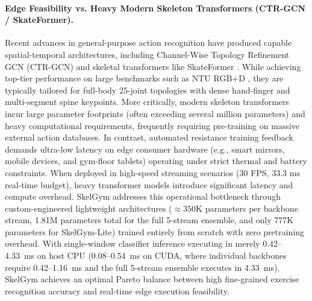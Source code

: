 \documentclass[runningheads]{llncs}
\begin{document}
\paragraph{Edge Feasibility vs. Heavy Modern Skeleton Transformers (CTR-GCN / SkateFormer).}
Recent advances in general-purpose action recognition have produced capable spatial-temporal architectures, including Channel-Wise Topology Refinement GCN (CTR-GCN) \cite{chen2021channel} and skeletal transformers like SkateFormer \cite{zheng2024skateformer}. While achieving top-tier performance on large benchmarks such as NTU RGB+D \cite{shahroudy2016}, they are typically tailored for full-body 25-joint topologies with dense hand-finger and multi-segment spine keypoints. More critically, modern skeleton transformers incur large parameter footprints (often exceeding several million parameters) and heavy computational requirements, frequently requiring pre-training on massive external action databases.
In contrast, automated resistance training feedback demands ultra-low latency on edge consumer hardware (e.g., smart mirrors, mobile devices, and gym-floor tablets) operating under strict thermal and battery constraints. When deployed in high-speed streaming scenarios (30 FPS, $33.3\text{ ms}$ real-time budget), heavy transformer models introduce significant latency and compute overhead. SkelGym addresses this operational bottleneck through custom-engineered lightweight architectures ($\approx 350\text{K}$ parameters per backbone stream, 1.81M parameters total for the full 5-stream ensemble, and only 777K parameters for SkelGym-Lite) trained entirely from scratch with zero pretraining overhead. With single-window classifier inference executing in merely 0.42--4.33~ms on host CPU (0.08--0.54~ms on CUDA, where individual backbones require 0.42--1.16~ms and the full 5-stream ensemble executes in 4.33~ms), SkelGym achieves an optimal Pareto balance between high fine-grained exercise recognition accuracy and real-time edge execution feasibility.
\end{document}
